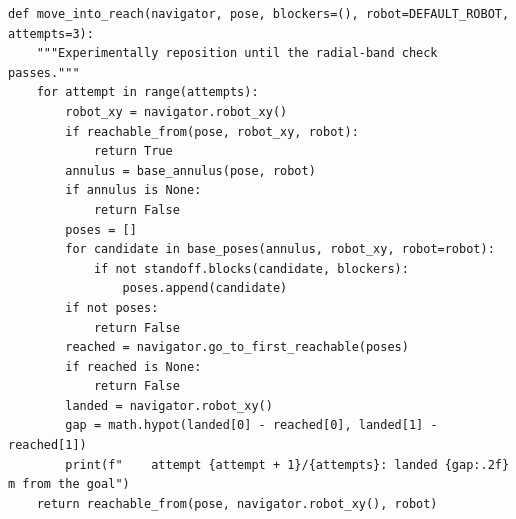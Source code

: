 \documentclass[11pt,a4paper]{book}
\begin{document}
\begin{lstlisting}[firstnumber=186]
def move_into_reach(navigator, pose, blockers=(), robot=DEFAULT_ROBOT, attempts=3):
    """Experimentally reposition until the radial-band check passes."""
    for attempt in range(attempts):
        robot_xy = navigator.robot_xy()
        if reachable_from(pose, robot_xy, robot):
            return True
        annulus = base_annulus(pose, robot)
        if annulus is None:
            return False
        poses = []
        for candidate in base_poses(annulus, robot_xy, robot=robot):
            if not standoff.blocks(candidate, blockers):
                poses.append(candidate)
        if not poses:
            return False
        reached = navigator.go_to_first_reachable(poses)
        if reached is None:
            return False
        landed = navigator.robot_xy()
        gap = math.hypot(landed[0] - reached[0], landed[1] - reached[1])
        print(f"    attempt {attempt + 1}/{attempts}: landed {gap:.2f} m from the goal")
    return reachable_from(pose, navigator.robot_xy(), robot)
\end{lstlisting}
\end{document}
